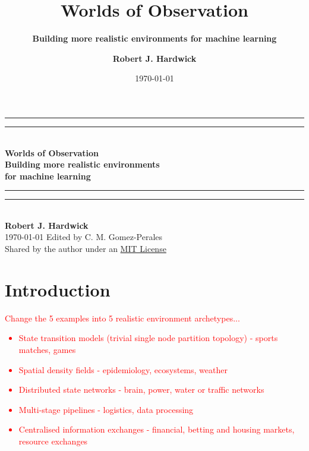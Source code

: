 \documentclass{book}
\title{\Huge \bfseries\sffamily Worlds of Observation}
\subtitle{\Large \bfseries\sffamily \color{gray75} Building more realistic environments for machine learning}
\author{\bfseries\sffamily Robert J. Hardwick}
\date{\today}
\begin{document}
\begin{titlepage}
\centering
\vspace*{1.5\baselineskip}
{\color{gray75}\rule{13cm}{1.3pt}}\vspace*{-\baselineskip}\vspace*{2pt} %
{\color{gray75}\rule{13cm}{0.4pt}} \\ %
\vspace{1.2\baselineskip} %
{\Huge \bfseries\sffamily Worlds of Observation} \\ 
\vspace{4mm}
{\Large \bfseries\sffamily \color{gray75} Building more realistic environments\\ for machine learning \\}
\vspace*{0.75\baselineskip}
{\color{gray75}\rule{13cm}{0.4pt}}\vspace*{-\baselineskip}\vspace*{2.75pt} %
{\color{gray75}\rule{13cm}{1.3pt}} \\ %
\vspace{1.0\baselineskip} %
{\large \bfseries\sffamily Robert J. Hardwick \\
\vspace*{1.2\baselineskip}}
\today
\vfill
Edited by C. M. Gomez-Perales \\ \vspace{1mm}
Shared by the author under an \href{https://opensource.org/licenses/MIT}{MIT License}
\end{titlepage}

\chapter*{Introduction}

\textcolor{red}{Change the 5 examples into 5 realistic environment archetypes...
\begin{itemize}
\item{State transition models (trivial single node partition topology) - sports matches, games}
\item{Spatial density fields - epidemiology, ecosystems, weather}
\item{Distributed state networks - brain, power, water or traffic networks}
\item{Multi-stage pipelines - logistics, data processing}
\item{Centralised information exchanges - financial, betting and housing markets, resource exchanges}
\end{itemize}}
\end{document}
